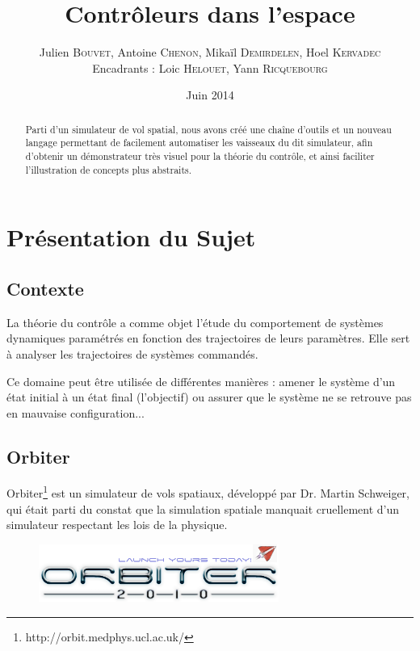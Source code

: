 \documentclass[a4paper,11pt]{article}
\title{\textbf{Contrôleurs dans l'espace}}
\author{Julien \textsc{Bouvet}, Antoine \textsc{Chenon}, Mikaïl \textsc{Demirdelen}, Hoel \textsc{Kervadec}
        \\
        Encadrants : Loic \textsc{Helouet}, Yann \textsc{Ricquebourg}}
\date{Juin 2014}
\begin{document}
\thispagestyle{empty}

\maketitle
\begin{abstract}
    Parti d'un simulateur de vol spatial, nous avons créé une chaîne d'outils et un nouveau langage permettant de facilement automatiser les vaisseaux du dit simulateur, afin d'obtenir un démonstrateur très visuel pour la théorie du contrôle, et ainsi faciliter l'illustration de concepts plus abstraits.
\end{abstract}



\section{Présentation du Sujet}
    \subsection{Contexte}
        La théorie du contrôle a comme objet l'étude du comportement de systèmes dynamiques paramétrés en fonction des trajectoires de leurs paramètres. Elle sert à analyser les trajectoires de systèmes commandés.

        Ce domaine peut être utilisée de différentes manières : amener le système d'un état initial à un état final (l'objectif) ou assurer que le système ne se retrouve pas en mauvaise configuration...

    \subsection{Orbiter}
        Orbiter\footnote{http://orbit.medphys.ucl.ac.uk/} est un simulateur de vols spatiaux, développé par Dr. Martin Schweiger, qui était parti du constat que la simulation spatiale manquait cruellement d'un simulateur respectant les lois de la physique.

        \begin{figure}[!h]
            \begin{center}
                \includegraphics[width=0.7\textwidth]{img/orbiter_logo.png}
            \end{center}
        \end{figure}
\end{document}
